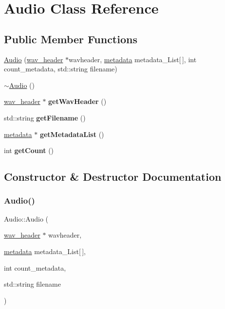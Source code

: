 \hypertarget{classAudio}{}\section{Audio Class Reference}
\label{classAudio}
\subsection*{Public Member Functions}
\begin{DoxyCompactItemize}
\item 
\hyperlink{classAudio_a219fef2857b36e3c0b4d04e1ec5d5927}{Audio} (\hyperlink{structwav__header}{wav\+\_\+header} $\ast$wavheader, \hyperlink{structmetadata}{metadata} metadata\+\_\+\+List\mbox{[}$\,$\mbox{]}, int count\+\_\+metadata, std\+::string filename)
\item 
\hyperlink{classAudio_ae8f54deecb5f48511aaab469e80294d6}{$\sim$\+Audio} ()
\item 
\mbox{\label{classAudio_ac0c6115c2102ec602cdc99dc9929fb86}} 
\hyperlink{structwav__header}{wav\+\_\+header} $\ast$ {\bfseries get\+Wav\+Header} ()
\item 
\mbox{\label{classAudio_a33b723e5b540b84b1d7fcd59d0eee567}} 
std\+::string {\bfseries get\+Filename} ()
\item 
\mbox{\label{classAudio_a6da23521eb58061da65ac88823b875e6}} 
\hyperlink{structmetadata}{metadata} $\ast$ {\bfseries get\+Metadata\+List} ()
\item 
\mbox{\label{classAudio_acd1ab84a9b985a1792238313d9fc3448}} 
int {\bfseries get\+Count} ()
\end{DoxyCompactItemize}


\subsection{Constructor \& Destructor Documentation}
\mbox{\label{classAudio_a219fef2857b36e3c0b4d04e1ec5d5927}} 
\subsubsection{\texorpdfstring{Audio()}{Audio()}}
{\footnotesize\ttfamily Audio\+::\+Audio (\begin{DoxyParamCaption}\item[{\hyperlink{structwav__header}{wav\+\_\+header} $\ast$}]{wavheader,  }\item[{\hyperlink{structmetadata}{metadata}}]{metadata\+\_\+\+List\mbox{[}$\,$\mbox{]},  }\item[{int}]{count\+\_\+metadata,  }\item[{std\+::string}]{filename }\end{DoxyParamCaption})}

